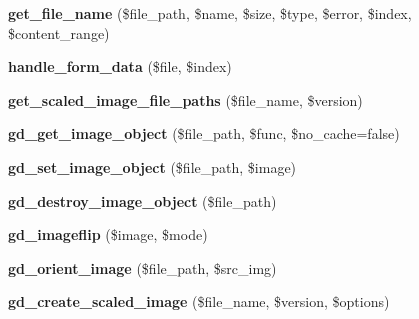 \begin{DoxyCompactItemize}
\item 
\hypertarget{class_upload_handler_afd05e42924ffa254e805d27c029c92bc}{{\bfseries get\-\_\-file\-\_\-name} (\$file\-\_\-path, \$name, \$size, \$type, \$error, \$index, \$content\-\_\-range)}\label{class_upload_handler_afd05e42924ffa254e805d27c029c92bc}

\item 
\hypertarget{class_upload_handler_a856f63c260031cbbf4762b47f3d7cbd0}{{\bfseries handle\-\_\-form\-\_\-data} (\$file, \$index)}\label{class_upload_handler_a856f63c260031cbbf4762b47f3d7cbd0}

\item 
\hypertarget{class_upload_handler_a2af760a58a405fe66b18bdf37f957426}{{\bfseries get\-\_\-scaled\-\_\-image\-\_\-file\-\_\-paths} (\$file\-\_\-name, \$version)}\label{class_upload_handler_a2af760a58a405fe66b18bdf37f957426}

\item 
\hypertarget{class_upload_handler_a3e600c79f487b34d5206c41bb129ff2f}{{\bfseries gd\-\_\-get\-\_\-image\-\_\-object} (\$file\-\_\-path, \$func, \$no\-\_\-cache=false)}\label{class_upload_handler_a3e600c79f487b34d5206c41bb129ff2f}

\item 
\hypertarget{class_upload_handler_a11b39cf0ff461b7246f99f690426ecff}{{\bfseries gd\-\_\-set\-\_\-image\-\_\-object} (\$file\-\_\-path, \$image)}\label{class_upload_handler_a11b39cf0ff461b7246f99f690426ecff}

\item 
\hypertarget{class_upload_handler_a1c419f7991a880ff2dda08e030d5ebf2}{{\bfseries gd\-\_\-destroy\-\_\-image\-\_\-object} (\$file\-\_\-path)}\label{class_upload_handler_a1c419f7991a880ff2dda08e030d5ebf2}

\item 
\hypertarget{class_upload_handler_a4cfbebe756a70da8f67d9b17af532307}{{\bfseries gd\-\_\-imageflip} (\$image, \$mode)}\label{class_upload_handler_a4cfbebe756a70da8f67d9b17af532307}

\item 
\hypertarget{class_upload_handler_a5e5a5d22fdf1f49de8b064f6daca4184}{{\bfseries gd\-\_\-orient\-\_\-image} (\$file\-\_\-path, \$src\-\_\-img)}\label{class_upload_handler_a5e5a5d22fdf1f49de8b064f6daca4184}

\item 
\hypertarget{class_upload_handler_ad9d23a1fda9d09bd4995dbfbf73223e9}{{\bfseries gd\-\_\-create\-\_\-scaled\-\_\-image} (\$file\-\_\-name, \$version, \$options)}\label{class_upload_handler_ad9d23a1fda9d09bd4995dbfbf73223e9}


\end{DoxyCompactItemize}
